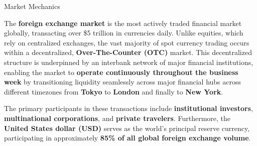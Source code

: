 \documentclass[10pt]{article}
\begin{document}
    \begin{core}{Market Mechanics}

      The \textbf{foreign exchange market} is the most actively traded financial market globally, transacting over \$5 trillion in currencies daily. Unlike equities, which rely on centralized exchanges, the vast majority of spot currency trading occurs within a decentralized, \textbf{Over-The-Counter (OTC)} market. This decentralized structure is underpinned by an interbank network of major financial institutions, enabling the market to \textbf{operate continuously throughout the business week} by transitioning liquidity seamlessly across major financial hubs across different timezones from \textbf{Tokyo} to \textbf{London} and finally to \textbf{New York}.

      The primary participants in these transactions include \textbf{institutional investors}, \textbf{multinational corporations}, and \textbf{private travelers}. Furthermore, the \textbf{United States dollar (USD)} serves as the world's principal reserve currency, participating in approximately \textbf{85\% of all global foreign exchange volume}.

\end{core}
\end{document}
